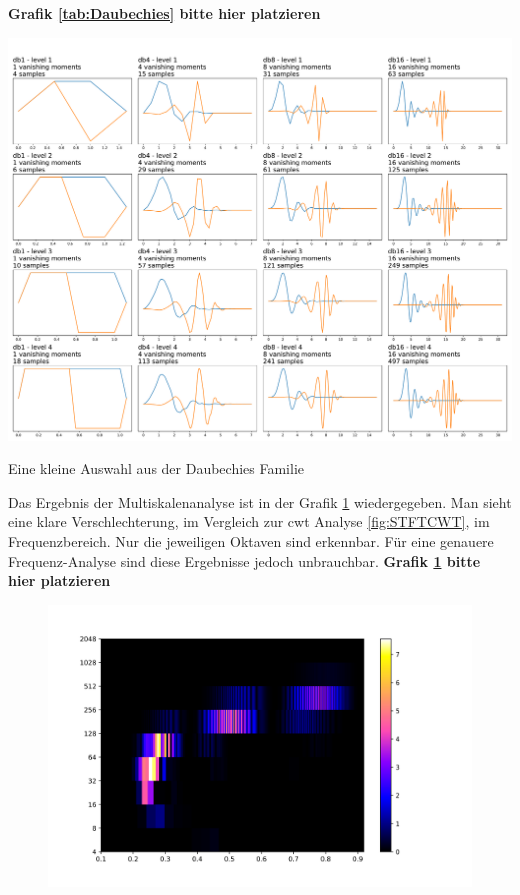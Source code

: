  \color{red}\textbf{Grafik \ref{tab:Daubechies} bitte hier platzieren} \color{black} %
\begin{table}
	\includegraphics[width=\linewidth]{papers/autotune/sections/frequenzanalyse/images/DaubechiesFamilie.pdf}
	\caption{Eine kleine Auswahl aus der Daubechies Familie}
	\label{tab:Daubechies}
\end{table}

Das Ergebnis der Multiskalenanalyse ist in der Grafik \ref{fig:sin-sweep} wiedergegeben. Man sieht eine klare Verschlechterung, im Vergleich zur cwt Analyse  \ref{fig:STFTCWT}, im Frequenzbereich. Nur die jeweiligen Oktaven sind erkennbar. Für eine genauere Frequenz-Analyse sind diese Ergebnisse jedoch unbrauchbar.  
 \color{red}\textbf{Grafik \ref{fig:sin-sweep} bitte hier platzieren} \color{black} %
\begin{figure}[!ht]
	\centering
	\includegraphics[width=\linewidth]{papers/autotune/sections/frequenzanalyse/images/sweepdwt.jpg}
	\label{fig:sin-sweep}
\end{figure}%


\newpage

